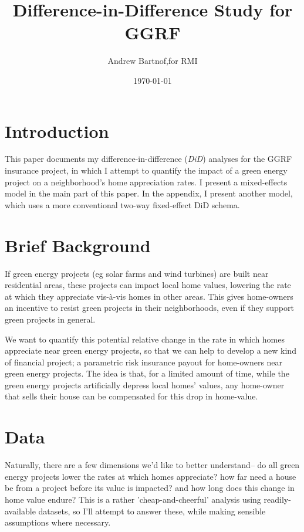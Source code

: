 \documentclass{article}
\begin{document}
\author{Andrew Bartnof,for RMI}
\title{Difference-in-Difference Study for GGRF}
\date{\today}
\maketitle

\section{Introduction}

This paper documents my difference-in-difference (\emph{DiD}) analyses for the GGRF insurance project, in which I attempt to quantify the impact of a green energy project on a neighborhood's home appreciation rates.
I present a mixed-effects model in the main part of this paper.
In the appendix, I present another model, which uses a more conventional two-way fixed-effect DiD schema.

\section{Brief Background}

If green energy projects (eg solar farms and wind turbines) are built near residential areas, these projects can impact local home values, lowering the rate at which they appreciate vis-\`a-vis homes in other areas.
This gives home-owners an incentive to resist green projects in their neighborhoods, even if they support green projects in general.

We want to quantify this potential relative change in the rate in which homes appreciate near green energy projects, so that we can help to develop a new kind of financial project; a parametric risk insurance payout for home-owners near green energy projects.
The idea is that, for a limited amount of time, while the green energy projects artificially depress local homes' values, any home-owner that sells their house can be compensated for this drop in home-value.


\section{Data}

Naturally, there are a few dimensions we'd like to better understand-- do all green energy projects lower the rates at which homes appreciate? how far need a house be from a project before its value is impacted? and how long does this change in home value endure?
This is a rather 'cheap-and-cheerful' analysis using readily-available datasets, so I'll attempt to answer these, while making sensible assumptions where necessary.
\end{document}
